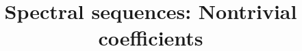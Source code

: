 \documentclass{ximera}
\title{Spectral sequences: Nontrivial coefficients}
\begin{document}
\begin{abstract}

\end{abstract}
\maketitle

\end{document}
